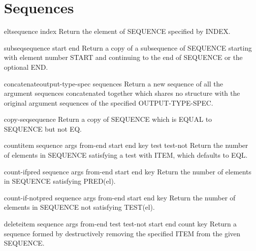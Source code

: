 \chapter{Sequences}

\begin{accessor}{elt}{sequence index}{}{}
  Return the element of SEQUENCE specified by INDEX.
\end{accessor}

\begin{accessor}{subseq}{sequence start \op end}{}{}
  Return a copy of a subsequence of SEQUENCE starting with element number
   START and continuing to the end of SEQUENCE or the optional END.
\end{accessor}

\begin{function}{concatenate}{output-type-spec \rest sequences}{}{}
  Return a new sequence of all the argument sequences concatenated together
  which shares no structure with the original argument sequences of the
  specified OUTPUT-TYPE-SPEC.
\end{function}

\begin{function}{copy-seq}{sequence}{}{}
  Return a copy of SEQUENCE which is EQUAL to SEQUENCE but not EQ.
\end{function}

\begin{function}{count}{item sequence \rest args \key from-end start end key test test-not}{}{}
  Return the number of elements in SEQUENCE satisfying a test with ITEM,
   which defaults to EQL.
\end{function}

\begin{function}{count-if}{pred sequence \rest args \key from-end start end key}{}{}
  Return the number of elements in SEQUENCE satisfying PRED(el).
\end{function}

\begin{function}{count-if-not}{pred sequence \rest args \key from-end start end key}{}{}
  Return the number of elements in SEQUENCE not satisfying TEST(el).
\end{function}

\begin{function}{delete}{item sequence \rest args \key from-end test test-not start end count key}{}{}
  Return a sequence formed by destructively removing the specified ITEM from
  the given SEQUENCE.
\end{function}

